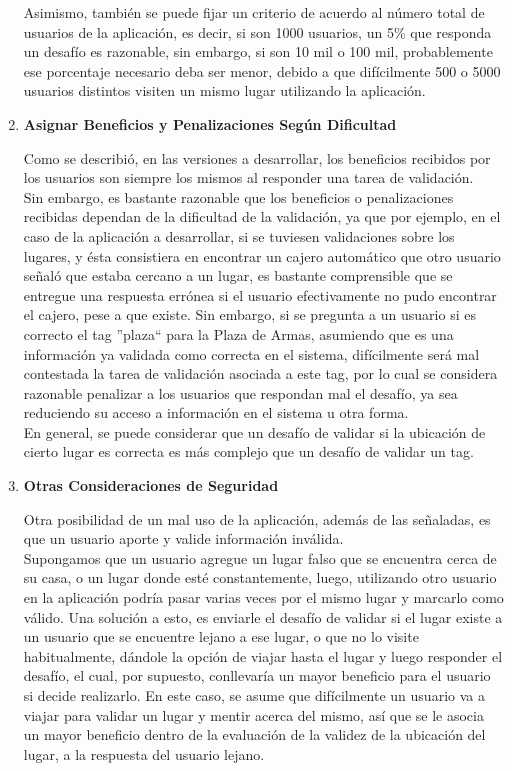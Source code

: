 \documentclass[10pt,letterpaper]{article}
\begin{document}
\begin{enumerate}
Asimismo, también se puede fijar un criterio de acuerdo al número total de usuarios de la aplicación, es decir, si son 1000 usuarios, un 5\% que responda un desafío es razonable, sin embargo, si son 10 mil o 100 mil, probablemente ese porcentaje necesario deba ser menor, debido a que difícilmente 500 o 5000 usuarios distintos visiten un mismo lugar utilizando la aplicación.\\

\item \textbf{Asignar Beneficios y Penalizaciones Según Dificultad}

Como se describió, en las versiones a desarrollar, los beneficios recibidos por los usuarios son siempre los mismos al responder una tarea de validación.\\

Sin embargo, es bastante razonable que los beneficios o penalizaciones recibidas dependan de la dificultad de la validación, ya que por ejemplo, en el caso de la aplicación a desarrollar, si se tuviesen validaciones sobre los lugares, y ésta consistiera en encontrar un cajero automático que otro usuario señaló que estaba cercano a un lugar, es bastante comprensible que se entregue una respuesta errónea si el usuario efectivamente no pudo encontrar el cajero, pese a que existe. Sin embargo, si se pregunta a un usuario si es correcto el tag ''plaza`` para la Plaza de Armas, asumiendo que es una información ya validada como correcta en el sistema, difícilmente será mal contestada la tarea de validación asociada a este tag, por lo cual se considera razonable penalizar a los usuarios que respondan mal el desafío, ya sea reduciendo su acceso a información en el sistema u otra forma.\\

En general, se puede considerar que un desafío de validar si la ubicación de cierto lugar es correcta es más complejo que un desafío de validar un tag.\\

\item \textbf{Otras Consideraciones de Seguridad}

Otra posibilidad de un mal uso de la aplicación, además de las señaladas, es que un usuario aporte y valide información inválida.\\ Supongamos que un usuario agregue un lugar falso que se encuentra cerca de su casa, o un lugar donde esté constantemente, luego, utilizando otro usuario en la aplicación podría pasar varias veces por el mismo lugar y marcarlo como válido. Una solución a esto, es enviarle el desafío de validar si el lugar existe a un usuario que se encuentre lejano a ese lugar, o que no lo visite habitualmente, dándole la opción de viajar hasta el lugar y luego responder el desafío, el cual, por supuesto, conllevaría un mayor beneficio para el usuario si decide realizarlo. En este caso, se asume que difícilmente un usuario va a viajar para validar un lugar y mentir acerca del mismo, así que se le asocia un mayor beneficio dentro de la evaluación de la validez de la ubicación del lugar, a la respuesta del usuario lejano.\\


\end{enumerate}
\end{document}
